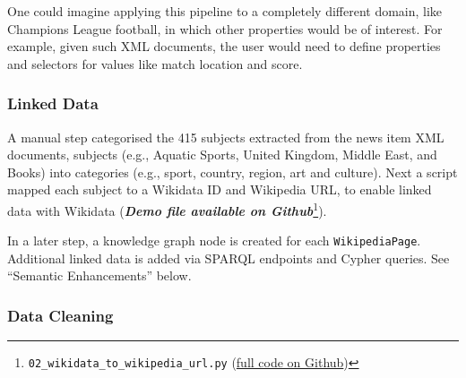 \documentclass[11pt]{article}
\begin{document}
    One could imagine applying this pipeline to a completely different domain, like Champions League football, in which other properties would be of interest. For example, given such XML documents, the user would need to define properties and selectors for values like match location and score.
    
    \subsubsection{Linked Data}

    A manual step categorised the 415 subjects extracted from the news item XML documents, subjects (e.g., Aquatic Sports, United Kingdom, Middle East, and Books) into categories (e.g., sport, country, region, art and culture). Next a script mapped each subject to a Wikidata ID and Wikipedia URL, to enable linked data with Wikidata (\textit{\textbf{Demo file available on Github}}\footnote{\lstinline{02_wikidata_to_wikipedia_url.py} (\href{https://github.com/Birkbeck/msc-data-science-project-2020_21---files-heychrisek/}{full code on Github})}).
    
    In a later step, a knowledge graph node is created for each \lstinline{WikipediaPage}. Additional linked data is added via SPARQL endpoints and Cypher queries. See ``Semantic Enhancements'' below.
    
    \subsubsection{Data Cleaning}
    
\end{document}
